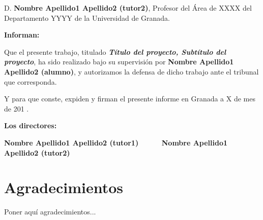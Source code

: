 \vspace{0.5cm}

D. \textbf{Nombre Apellido1 Apellido2 (tutor2)}, Profesor del Área de XXXX del Departamento YYYY de la Universidad de Granada.


\vspace{0.5cm}

\textbf{Informan:}

\vspace{0.5cm}

Que el presente trabajo, titulado \textit{\textbf{Título del proyecto, Subtítulo del proyecto}},
ha sido realizado bajo su supervisión por \textbf{Nombre Apellido1 Apellido2 (alumno)}, y autorizamos la defensa de dicho trabajo ante el tribunal
que corresponda.

\vspace{0.5cm}

Y para que conste, expiden y firman el presente informe en Granada a X de mes de 201 .

\vspace{1cm}

\textbf{Los directores:}

\vspace{5cm}

\noindent \textbf{Nombre Apellido1 Apellido2 (tutor1) \ \ \ \ \ Nombre Apellido1 Apellido2 (tutor2)}

\chapter*{Agradecimientos}
\thispagestyle{empty}

       \vspace{1cm}


Poner aquí agradecimientos...

